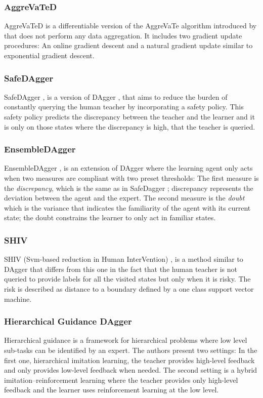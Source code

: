 \subsubsection*{AggreVaTeD}
AggreVaTeD \cite{AggreVaTeD-Sun:2017} is a differentiable version of the AggreVaTe algorithm introduced by \cite{AggreVaTe-Ross-Bagnell:2014} that does not perform any data aggregation. It includes two gradient update procedures: An online gradient descent and a natural gradient update similar to exponential gradient descent.

\subsubsection*{SafeDAgger}
SafeDAgger \cite{SafeDAgger-Zhang-Cho:2016}, is a version of DAgger \cite{DAgger-Ross:2011}, that aims to reduce the burden of constantly querying the human teacher by incorporating a safety policy. This safety policy predicts the discrepancy between the teacher and the learner and it is only on those states where the discrepancy is high, that the teacher is queried.

\subsubsection*{EnsembleDAgger}
EnsembleDAgger \cite{EnsembleDAgger-Menda:2019}, is an extension of DAgger where the learning agent only acts when two measures are compliant with two preset thresholds: The first measure is the \textit{discrepancy}, which is the same as in SafeDagger \cite{SafeDAgger-Zhang-Cho:2016}; discrepancy represents the deviation between the agent and the expert. The second measure is the \textit{doubt} which is the variance that indicates the familiarity of the agent with its current state; the doubt constrains the learner to only act in familiar states. 

\subsubsection*{SHIV}
SHIV (Svm-based reduction in Human InterVention) \cite{SHIV-Laskey:2016},  is a method similar to DAgger \cite{DAgger-Ross:2011} that differs from this one in the fact that the human teacher is not queried to provide labels for all the visited states but only when it is risky. The risk is described as distance to a boundary defined by a one class support vector machine.

\subsubsection*{Hierarchical Guidance DAgger}
Hierarchical guidance \cite{Hierarchical-guidance-Le:2018} is a framework for hierarchical problems where low level sub-tasks can be identified by an expert. The authors present two settings: In the first one, hierarchical imitation learning,  the teacher provides high-level feedback and only provides low-level feedback when needed. The second setting is a hybrid imitation–reinforcement learning where the teacher provides only high-level feedback and the learner uses reinforcement learning at the low level.



